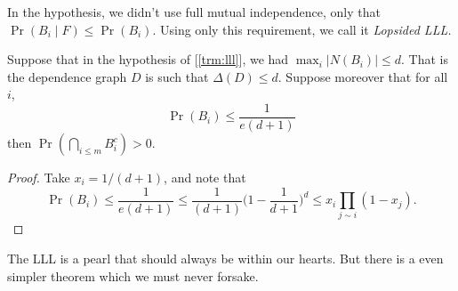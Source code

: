\begin{remark}
	In the hypothesis, we didn't use full mutual independence, only that
	$\Pr(B_i \mid F) \leq \Pr(B_i)$. Using only this requirement,
	we call it \it{Lopsided LLL}.
\end{remark}

\begin{corollary} 
	Suppose  that in the hypothesis of [\ref{trm:lll}], we had $\max_i
	|N(B_i)| \leq d$. That is the dependence graph $D$
	is such that $\Delta(D) \leq d$. Suppose moreover that for all $i$,
	\[
		\Pr(B_i) \leq \frac{1}{e(d+1)}
	\]
	then $\Pr(\bigcap_{i \leq m} B_i^c) > 0$.
\end{corollary}
\begin{proof}
	Take $x_i = 1/(d+1)$, and note that
	\[
		\Pr(B_i) \leq \frac{1}{e(d+1)} \leq \frac{1}{(d+1)}\bigg(1 -
		\frac{1}{d+1}\bigg)^d \leq x_i \prod_{j \sim i}(1 - x_j).
	\]
\end{proof}

The LLL is a pearl that should always be within our hearts. But there
is a even simpler theorem which we must never forsake.

